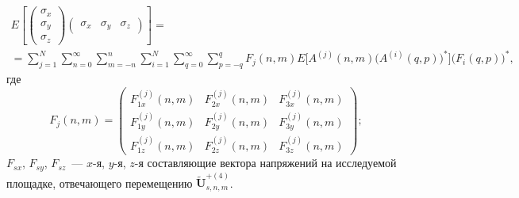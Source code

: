 \begin{multline}
E\left[
\begin{pmatrix}
\sigma_x \\
\sigma_y \\
\sigma_z 
\end{pmatrix}
\begin{pmatrix}
\sigma_x &
\sigma_y &
\sigma_z 
\end{pmatrix}
\right]= \\
=\sum_{j=1}^N\sum_{n=0}^\infty\sum_{m=-n}^n
\sum_{i=1}^N\sum_{q=0}^\infty\sum_{p=-q}^q F_j(n,m)E\Big[A^{(j)}(n,m)\Big(A^{(i)}(q,p)\Big)^*\Big]\Big(F_i(q,p)\Big)^*,
\label{eq:13:104}
\end{multline}
где 
$$
F_j(n,m)=
\begin{pmatrix}
F_{1x}^{(j)}(n,m) & F_{2x}^{(j)}(n,m) & F_{3x}^{(j)}(n,m) \\
F_{1y}^{(j)}(n,m) & F_{2y}^{(j)}(n,m) & F_{3y}^{(j)}(n,m) \\
F_{1z}^{(j)}(n,m) & F_{2z}^{(j)}(n,m) & F_{3z}^{(j)}(n,m)
\end{pmatrix};
$$
$F_{sx}$, $F_{sy}$, $F_{sz}$~--- $x$-я, $y$-я, $z$-я составляющие вектора напряжений на исследуемой площадке, отвечающего перемещению $\mathbf{\tilde U}_{s,n,m}^{+(4)}$.

